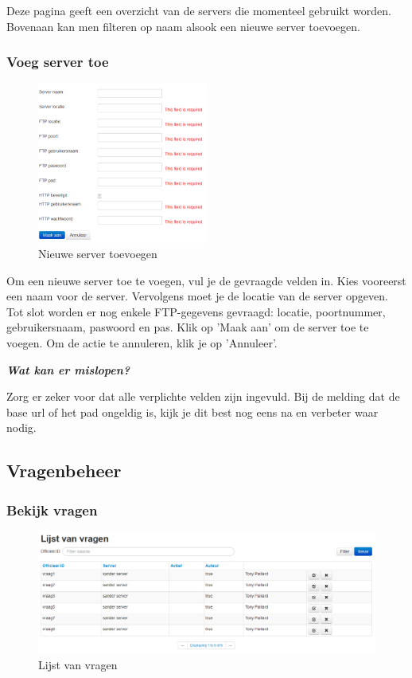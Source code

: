 \documentclass[]{article}
\begin{document}
Deze pagina geeft een overzicht van de servers die momenteel gebruikt worden. Bovenaan kan men filteren op naam alsook een nieuwe server toevoegen.

\subsubsection{Voeg server toe}

\begin{figure}[!ht]
	\centering
	\includegraphics[width=0.5\textwidth]{img/new_server}
	\caption{Nieuwe server toevoegen}
	\label{new_server}
\end{figure}

Om een nieuwe server toe te voegen, vul je de gevraagde velden in. Kies vooreerst een naam voor de server. Vervolgens moet je de locatie van de server opgeven. Tot slot worden er nog enkele FTP-gegevens gevraagd: locatie, poortnummer, gebruikersnaam, paswoord en pas. Klik op 'Maak aan' om de server toe te voegen. Om de actie te annuleren, klik je op 'Annuleer'.

\textbf{\textit{Wat kan er mislopen?}}

Zorg er zeker voor dat alle verplichte velden zijn ingevuld. Bij de melding dat de base url of het pad ongeldig is, kijk je dit best nog eens na en verbeter waar nodig.

\subsection{Vragenbeheer}

\subsubsection{Bekijk vragen}

\begin{figure}[!ht]
	\centering
	\includegraphics[width=1\textwidth]{img/questions}
	\caption{Lijst van vragen}
	\label{questions}
\end{figure}
\end{document}
